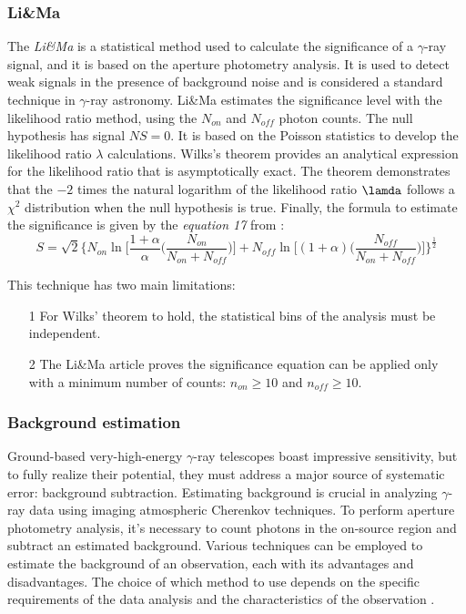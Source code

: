 \subsubsection{Li\&Ma}
\label{ss:li-ma}
The \textit{Li\&Ma} is a statistical method used to calculate the significance of a $\gamma$-ray signal, and it is based on the aperture photometry analysis. It is used to detect weak signals in the presence of background noise and is considered a standard technique in $\gamma$-ray astronomy. Li\&Ma estimates the significance level with the likelihood ratio method, using the $N_{on}$ and $N_{off}$ photon counts. The null hypothesis has signal $NS = 0$. It is based on the Poisson statistics to develop the likelihood ratio $\lambda$ calculations. Wilks's theorem \cite{wilks_1938} provides an analytical expression for the likelihood ratio that is asymptotically exact. The theorem demonstrates that the $-2$ times the natural logarithm of the likelihood ratio $\lamda$ follows a $\chi^2$ distribution when the null hypothesis is true. Finally, the formula to estimate the significance is given by the \textit{equation 17} from \cite{Lima_1983}: 
\begin{equation}
S = \sqrt{2}\biggl\{N_{on}\ln\biggr[ \frac{1+\alpha}{\alpha} \biggl( \frac{N_{on}}{N_{on}+N_{off}}\biggl) \biggr] + N_{off}\ln\biggr[(1+\alpha)\biggl(\frac{N_{off}}{N_{on}+N_{off}}\biggl) \biggr] \biggl\}^\frac{1}{2}
\end{equation}


This technique has two main limitations:
\begin{enumerate}
    \item[1] For Wilks' theorem to hold, the statistical bins of the analysis must be independent.
    \item[2] The Li\&Ma article \cite{Lima_1983} proves the significance equation can be applied only with a minimum number of counts: $n_{on} \geq 10$ and $ n_{off} \geq 10$. 
\end{enumerate}


\subsubsection{Background estimation}
\label{sss:background-estimation}
Ground-based very-high-energy $\gamma$-ray telescopes boast impressive sensitivity, but to fully realize their potential, they must address a major source of systematic error: background subtraction. Estimating background is crucial in analyzing $\gamma$-ray data using imaging atmospheric Cherenkov techniques. To perform aperture photometry analysis, it's necessary to count photons in the on-source region and subtract an estimated background. Various techniques can be employed to estimate the background of an observation, each with its advantages and disadvantages. The choice of which method to use depends on the specific requirements of the data analysis and the characteristics of the observation \cite{Berge_2007}. 

